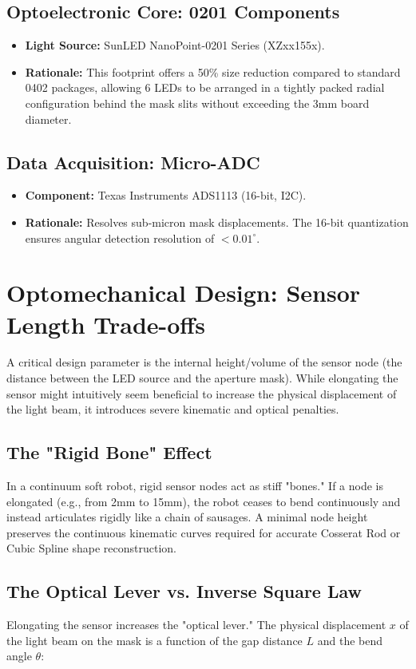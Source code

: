 \documentclass[11pt]{article}
\begin{document}
\subsection{Optoelectronic Core: 0201 Components}
\begin{itemize}
    \item \textbf{Light Source:} SunLED NanoPoint-0201 Series (XZxx155x).
    \item \textbf{Rationale:} This footprint offers a 50\% size reduction compared to standard 0402 packages, allowing 6 LEDs to be arranged in a tightly packed radial configuration behind the mask slits without exceeding the 3mm board diameter.
\end{itemize}

\subsection{Data Acquisition: Micro-ADC}
\begin{itemize}
    \item \textbf{Component:} Texas Instruments ADS1113 (16-bit, I2C).
    \item \textbf{Rationale:} Resolves sub-micron mask displacements. The 16-bit quantization ensures angular detection resolution of $<0.01^\circ$.
\end{itemize}

\section{Optomechanical Design: Sensor Length Trade-offs}
A critical design parameter is the internal height/volume of the sensor node (the distance between the LED source and the aperture mask). While elongating the sensor might intuitively seem beneficial to increase the physical displacement of the light beam, it introduces severe kinematic and optical penalties.

\subsection{The "Rigid Bone" Effect}
In a continuum soft robot, rigid sensor nodes act as stiff "bones." If a node is elongated (e.g., from 2mm to 15mm), the robot ceases to bend continuously and instead articulates rigidly like a chain of sausages. A minimal node height preserves the continuous kinematic curves required for accurate Cosserat Rod or Cubic Spline shape reconstruction.

\subsection{The Optical Lever vs. Inverse Square Law}
Elongating the sensor increases the "optical lever." The physical displacement $x$ of the light beam on the mask is a function of the gap distance $L$ and the bend angle $\theta$:
\end{document}
